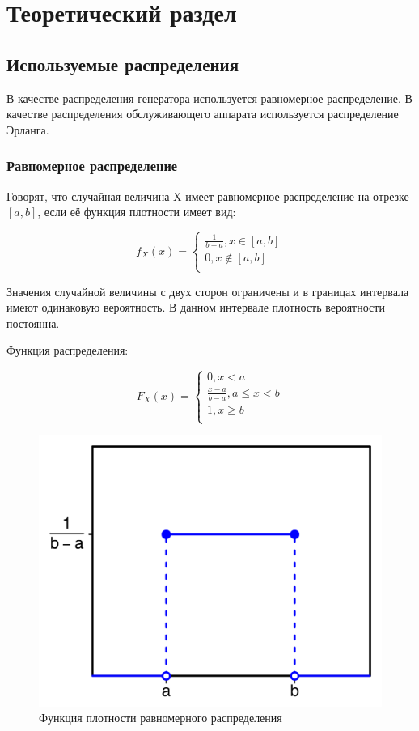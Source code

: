 \chapter{Теоретический раздел}

\section{Используемые распределения}

В качестве распределения генератора используется равномерное распределение. В качестве распределения обслуживающего аппарата используется распределение Эрланга.

\subsection{Равномерное распределение}
    
Говорят, что случайная величина X имеет равномерное распределение на отрезке $[a,b]$, если её функция плотности имеет вид:

\begin{equation*}
    f_X (x) =
    \begin{cases}
        \frac{1}{b-a}, x \in [a,b] \\
        0, x \notin [a, b] \\
    \end{cases}
\end{equation*}

Значения случайной величины с двух сторон ограничены и в границах интервала имеют одинаковую вероятность. В данном интервале плотность вероятности постоянна.

Функция распределения:

\begin{equation*}
F_X (x) =
    \begin{cases}
        0, x < a \\
        \frac{x - a}{b - a}, a \le x < b \\
        1, x \geq b \\
    \end{cases}
\end{equation*}

\begin{figure}[H]
    \begin{center}
    \includegraphics[width=0.5\linewidth]{assets/uni_f.png}
    \caption{Функция плотности равномерного распределения}
    \label{fig:}
    \end{center}
\end{figure}

